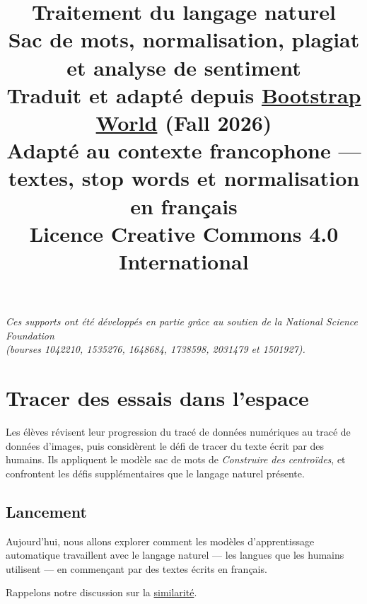 \documentclass[12pt,a4paper]{article}
\title{%
  \vspace{-2cm}
  {\Huge\bfseries Traitement du langage naturel}\\[0.5em]
  {\large Sac de mots, normalisation, plagiat et analyse de sentiment}\\[1em]
  {\normalsize Traduit et adapté depuis \href{https://www.bootstrapworld.org/materials/fall2026/en-us/lessons/natural-language/}{Bootstrap World} (Fall 2026)}\\
  {\normalsize Adapté au contexte francophone — textes, stop words et normalisation en français}\\[0.5em]
  {\normalsize Licence Creative Commons 4.0 International}
}
\date{}
\author{}
\begin{document}
\maketitle
\thispagestyle{empty}

\vspace{2cm}
\begin{center}
  \textit{Ces supports ont été développés en partie grâce au soutien de la National Science Foundation\\
  (bourses 1042210, 1535276, 1648684, 1738598, 2031479 et 1501927).}
\end{center}

\newpage
\tableofcontents
\newpage

\section{Tracer des essais dans l'espace}

\begin{overviewbox}
  Les élèves révisent leur progression du tracé de données numériques au tracé de données d'images, puis considèrent le défi de tracer du texte écrit par des humains. Ils appliquent le modèle sac de mots de \emph{Construire des centroïdes}, et confrontent les défis supplémentaires que le langage naturel présente.
\end{overviewbox}

\subsection{Lancement}

Aujourd'hui, nous allons explorer comment les modèles d'apprentissage automatique travaillent avec le langage naturel — les langues que les humains utilisent — en commençant par des textes écrits en français.

Rappelons notre discussion sur la \href{https://www.bootstrapworld.org/materials/fall2026/en-us/lessons/measuring-similarity/}{similarité}.
\end{document}
